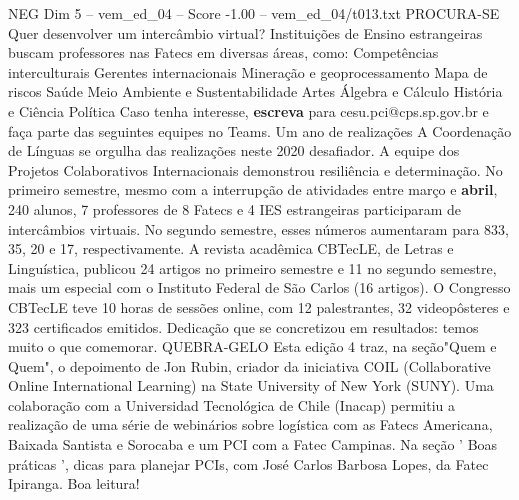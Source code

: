 \begin{textsample}{NEG Dim 5 – vem\_ed\_04 – Score -1.00 – vem\_ed\_04/t013.txt}  \label{ex:f5_neg_027}
PROCURA-SE Quer desenvolver um intercâmbio virtual?
Instituições de Ensino estrangeiras buscam professores nas Fatecs em diversas áreas, como: Competências interculturais Gerentes internacionais Mineração e geoprocessamento Mapa de riscos Saúde Meio Ambiente e Sustentabilidade Artes Álgebra e Cálculo História e Ciência Política Caso tenha interesse, \textbf{escreva} para cesu.pci@cps.sp.gov.br e faça parte das seguintes equipes no Teams.
Um ano de realizações A Coordenação de Línguas se orgulha das realizações neste 2020 desafiador.
A equipe dos Projetos Colaborativos Internacionais demonstrou resiliência e determinação.
No primeiro semestre, mesmo com a interrupção de atividades entre março e \textbf{abril}, 240 alunos, 7 professores de 8 Fatecs e 4 IES estrangeiras participaram de intercâmbios virtuais.
No segundo semestre, esses números aumentaram para 833, 35, 20 e 17, respectivamente.
A revista acadêmica CBTecLE, de Letras e Linguística, publicou 24 artigos no primeiro semestre e 11 no segundo semestre, mais um especial com o Instituto Federal de São Carlos (16 artigos).
O Congresso CBTecLE teve 10 horas de sessões online, com 12 palestrantes, 32 videopôsteres e 323 certificados emitidos.
Dedicação que se concretizou em resultados: temos muito o que comemorar.
QUEBRA-GELO Esta edição 4 traz, na seção"Quem e Quem", o depoimento de Jon Rubin, criador da iniciativa COIL (Collaborative Online International Learning) na State University of New York (SUNY).
Uma colaboração com a Universidad Tecnológica de Chile (Inacap) permitiu a realização de uma série de webinários sobre logística com as Fatecs Americana, Baixada Santista e Sorocaba e um PCI com a Fatec Campinas.
Na seção ' Boas práticas ', dicas para planejar PCIs, com José Carlos Barbosa Lopes, da Fatec Ipiranga.
Boa leitura!

\end{textsample}
